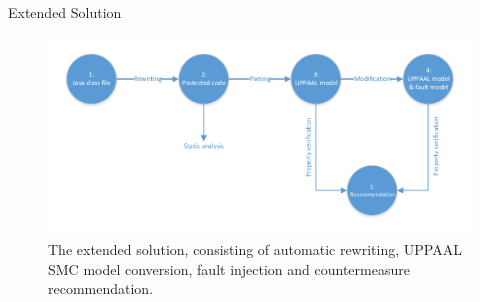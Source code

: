 \begin{frame}[fragile]{Extended Solution}


\begin{figure}
\centering
\includegraphics[scale=0.65]{figures/workflow.pdf}
\caption{\footnotesize The extended solution, consisting of automatic rewriting, UPPAAL SMC model conversion, fault injection and countermeasure recommendation.}
\label{test}
\end{figure}
\end{frame}